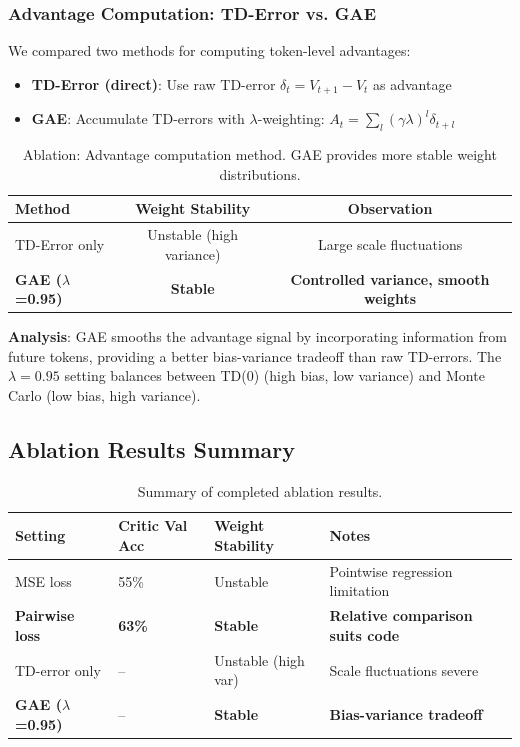\subsubsection{Advantage Computation: TD-Error vs. GAE}

We compared two methods for computing token-level advantages:

\begin{itemize}[nosep]
    \item \textbf{TD-Error (direct)}: Use raw TD-error $\delta_t = V_{t+1} - V_t$ as advantage
    \item \textbf{GAE}: Accumulate TD-errors with $\lambda$-weighting: $A_t = \sum_l (\gamma\lambda)^l \delta_{t+l}$
\end{itemize}

\begin{table}[h]
\centering
\caption{Ablation: Advantage computation method. GAE provides more stable weight distributions.}
\label{tab:ablation_advantage}
\begin{tabular}{lcc}
\toprule
\textbf{Method} & \textbf{Weight Stability} & \textbf{Observation} \\
\midrule
TD-Error only & Unstable (high variance) & Large scale fluctuations \\
\textbf{GAE ($\lambda$=0.95)} & \textbf{Stable} & \textbf{Controlled variance, smooth weights} \\
\bottomrule
\end{tabular}
\end{table}

\textbf{Analysis}: GAE smooths the advantage signal by incorporating information from future tokens, providing a better bias-variance tradeoff than raw TD-errors. The $\lambda=0.95$ setting balances between TD(0) (high bias, low variance) and Monte Carlo (low bias, high variance).

\subsection{Ablation Results Summary}

\begin{table}[h]
\centering
\caption{Summary of completed ablation results.}
\label{tab:ablation_summary}
\begin{tabular}{llll}
\toprule
\textbf{Setting} & \textbf{Critic Val Acc} & \textbf{Weight Stability} & \textbf{Notes} \\
\midrule
MSE loss & 55\% & Unstable & Pointwise regression limitation \\
\textbf{Pairwise loss} & \textbf{63\%} & \textbf{Stable} & \textbf{Relative comparison suits code} \\
\midrule
TD-error only & -- & Unstable (high var) & Scale fluctuations severe \\
\textbf{GAE ($\lambda$=0.95)} & -- & \textbf{Stable} & \textbf{Bias-variance tradeoff} \\
\bottomrule
\end{tabular}
\end{table}

